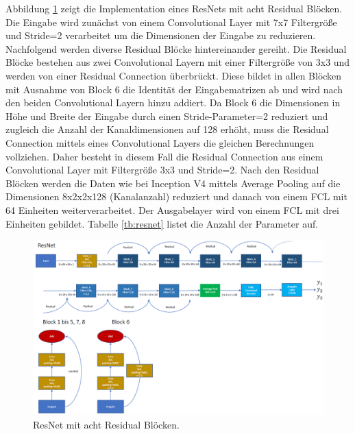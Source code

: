 Abbildung \ref{fig:resnet} zeigt die Implementation eines ResNets mit acht Residual Blöcken. Die Eingabe wird zunächst von einem Convolutional Layer mit 7x7 Filtergröße und Stride=2 verarbeitet um die Dimensionen der Eingabe zu reduzieren. Nachfolgend werden diverse Residual Blöcke hintereinander gereiht. Die Residual Blöcke bestehen aus zwei Convolutional Layern mit einer Filtergröße von 3x3 und werden von einer Residual Connection überbrückt. Diese bildet in allen Blöcken mit Ausnahme von Block 6 die Identität der Eingabematrizen ab und wird nach den beiden Convolutional Layern hinzu addiert. Da Block 6 die Dimensionen in Höhe und Breite der Eingabe durch einen Stride-Parameter=2 reduziert und zugleich die Anzahl der Kanaldimensionen auf 128 erhöht, muss die Residual Connection mittels eines Convolutional Layers die gleichen Berechnungen vollziehen. Daher besteht in diesem Fall die Residual Connection aus einem Convolutional Layer mit Filtergröße 3x3 und Stride=2. Nach den Residual Blöcken werden die Daten wie bei Inception V4 mittels Average Pooling auf die Dimensionen 8x2x2x128 (Kanalanzahl) reduziert und danach von einem FCL mit 64 Einheiten weiterverarbeitet. Der Ausgabelayer wird von einem FCL mit drei Einheiten gebildet. Tabelle \ref{tb:resnet} listet die Anzahl der Parameter auf.
\newpage
\begin{figure}[H]
\thispagestyle{empty}
\centering
\includegraphics[angle=90, scale=0.65]{pictures/Inception/ResNet}
\caption[Caption for LOF]{ResNet mit acht Residual Blöcken.}
\label{fig:resnet}
\end{figure}

